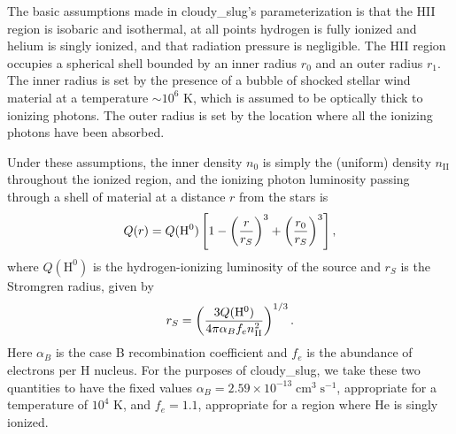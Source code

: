 \documentclass[letterpaper,10pt,english]{sphinxmanual}
\begin{document}
The basic assumptions made in cloudy\_slug's parameterization is
that the HII region is isobaric and isothermal, at all points hydrogen
is fully ionized and helium is singly ionized, and that radiation
pressure is negligible. The HII region occupies a spherical shell
bounded by an inner radius \(r_0\) and an outer radius
\(r_1\). The inner radius is set by the presence of a bubble of
shocked stellar wind material at a temperature \(\sim 10^6\) K,
which is assumed to be optically thick to ionizing photons. The
outer radius is set by the location where all the ionizing photons
have been absorbed.

Under these assumptions, the inner density \(n_0\) is simply the
(uniform) density \(n_{\mathrm{II}}\) throughout the ionized
region, and the ionizing photon luminosity passing through a shell of
material at a distance \(r\) from the stars is
\begin{gather}
\begin{split}Q(r) = Q(\mathrm{H}^0)
\left[1 - \left(\frac{r}{r_S}\right)^3 +
\left(\frac{r_0}{r_S}\right)^3\right],\end{split}\notag
\end{gather}
where \(Q(\mathrm{H}^0)\) is the hydrogen-ionizing luminosity of
the source and \(r_S\) is the Stromgren radius, given by
\begin{gather}
\begin{split}r_S = \left(\frac{3 Q(\mathrm{H}^0)}{4\pi
\alpha_B f_e n_{\mathrm{II}}^2}\right)^{1/3}.\end{split}\notag
\end{gather}
Here \(\alpha_B\) is the case B recombination coefficient and
\(f_e\) is the abundance of electrons per H nucleus. For the
purposes of cloudy\_slug, we take these two quantities to have
the fixed values \(\alpha_B = 2.59\times
10^{-13}\;\mathrm{cm}^3\;\mathrm{s}^{-1}\), appropriate for a
temperature of \(10^4\) K, and \(f_e = 1.1\), appropriate for
a region where He is singly ionized.
\end{document}
